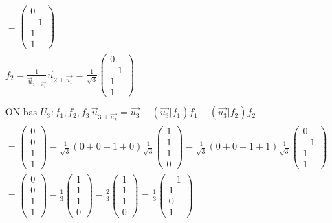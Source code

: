 \begin{align*}
  &\quad  = \begin{pmatrix} 0 \\ -1 \\ 1 \\ 1 \end{pmatrix} \\
  &\quad  f_2 = \frac{1}{\vec{u}_{2\perp\vec{u_1}}}\vec{u}_{2\perp\vec{u_1}} 
  = \frac{1}{\sqrt{3}}\begin{pmatrix} 0 \\ -1 \\ 1 \\ 1 \end{pmatrix}  \\
  &\quad  \\
  &\quad  \text{ON-bas } U_3: f_1,f_2,f_3 \, \vec{u}_{3\perp\vec{u_2}}
  = \vec{u_3} - (\vec{u_3}|f_1)f_1 - (\vec{u_3}|f_2)f_2 \\
  &\quad  = \begin{pmatrix} 0 \\ 0 \\ 1 \\ 1 \end{pmatrix}
  - \frac{1}{\sqrt{3}}(0+0+1+0)\frac{1}{\sqrt{3}}\begin{pmatrix} 1 \\ 1 \\ 1 \\ 0 \end{pmatrix}
  - \frac{1}{\sqrt{3}}(0+0+1+1)\frac{1}{\sqrt{3}}\begin{pmatrix} 0 \\ -1 \\ 1 \\ 1 \end{pmatrix} \\
  &\quad  =  \begin{pmatrix} 0 \\ 0 \\ 1 \\ 1 \end{pmatrix}
  - \frac{1}{3}\begin{pmatrix} 1 \\ 1 \\ 1 \\ 0 \end{pmatrix}
  - \frac{2}{3}\begin{pmatrix} 1 \\ 1 \\ 1 \\ 0 \end{pmatrix}
  = \frac{1}{3}\begin{pmatrix} -1 \\ 1 \\ 0 \\ 1 \end{pmatrix}

\end{align*}

